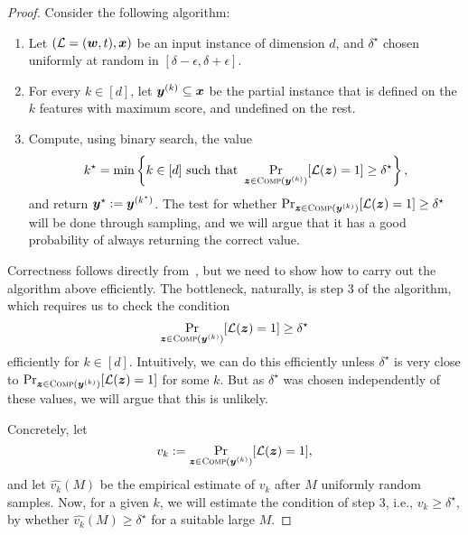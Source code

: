 \begin{proof}
Consider the following algorithm:

\begin{enumerate}
	\item Let $(\mathcal{L} = ({\bm{w}}, t), {\bm{x}})$ be an input instance of dimension $d$, and $\delta^\star$ chosen uniformly at random  in  $[\delta-\epsilon, \delta+\epsilon]$.
	\item For every $k \in [d]$, let ${\bm{y}}^{(k)} \subseteq {\bm{x}}$ be the partial instance that is defined on the $k$ features with maximum score, and undefined on the rest.
	\item Compute, using binary search, the value
	\[
		k^\star = \min \left\{ k \in [d] \text{ such that } \Pr_{{\bm{z}} \in \textsc{Comp}({\bm{y}}^{(k)})}[\mathcal{L}({\bm{z}}) = 1] \geq \delta^\star \right\},
	\]
	and return ${\bm{y}}^\star := {\bm{y}}^{(k^\star)}$. The test for whether $\Pr_{{\bm{z}} \in \textsc{Comp}({\bm{y}}^{(k)})}[\mathcal{L}({\bm{z}}) = 1] \geq \delta^\star$ will be done through sampling, and we will argue that it has a good probability of always returning the correct value.
\end{enumerate}

Correctness follows directly from~, but we need to show how to carry out the algorithm above efficiently.
The bottleneck, naturally, is step 3 of the algorithm, which requires us to check the condition
\[
	\Pr_{{\bm{z}} \in \textsc{Comp}({\bm{y}}^{(k)})}[\mathcal{L}({\bm{z}}) = 1] \geq \delta^\star  
\]
efficiently for $k \in [d]$. Intuitively, we can do this efficiently unless $\delta^\star$ is very close to
\(
	\Pr_{{\bm{z}} \in \textsc{Comp}({\bm{y}}^{(k)})}[\mathcal{L}({\bm{z}}) = 1]
\) for some $k$. But as $\delta^\star$ was chosen independently of these values, we will argue that this is unlikely. 

Concretely, let
\[
	v_k := \Pr_{{\bm{z}} \in \textsc{Comp}({\bm{y}}^{(k)})}[\mathcal{L}({\bm{z}}) = 1],
\]
and let 
\(
	\hat{v_k}(M)  
\) be the empirical estimate of $v_k$ after $M$ uniformly random samples. 
Now, for a given $k$, we will estimate the condition of step 3, i.e.,
\(
	v_k \geq \delta^\star,
\) by whether \(
	\hat{v_k}(M) \geq \delta^\star 
\) for a suitable large $M$.


\end{proof}
